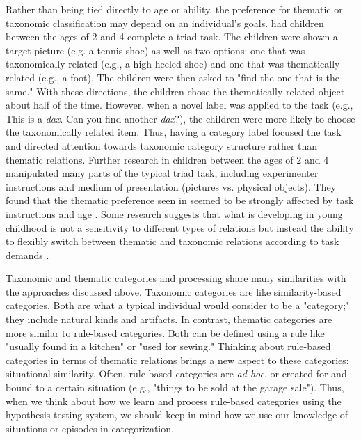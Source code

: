 \documentclass[../dissertation.tex]{subfiles}
\begin{document}
	Rather than being tied directly to age or ability, the preference for thematic or taxonomic classification may depend on an individual's goals. \citet{Markman1984} had children between the ages of 2 and 4 complete a triad task. The children were shown a target picture (e.g. a tennis shoe) as well as two options: one that was taxonomically related (e.g., a high-heeled shoe) and one that was thematically related (e.g., a foot). The children were then asked to "find the one that is the same." With these directions, the children chose the thematically-related object about half of the time. However, when a novel label was applied to the task (e.g., This is a \textit{dax}. Can you find another \textit{dax}?), the children were more likely to choose the taxonomically related item. Thus, having a category label focused the task and directed attention towards taxonomic category structure rather than thematic relations. Further research in children between the ages of 2 and 4 manipulated many parts of the typical triad task, including experimenter instructions and medium of presentation (pictures vs. physical objects). They found that the thematic preference seen in \citet{Smiley1979} seemed to be strongly affected by task instructions and age \citep{Waxman1997}. Some research suggests that what is developing in young childhood is not a sensitivity to different types of relations but instead the ability to flexibly switch between thematic and taxonomic relations according to task demands \citep{Blaye2001}. \par
	Taxonomic and thematic categories and processing share many similarities with the approaches discussed above. Taxonomic categories are like similarity-based categories. Both are what a typical individual would consider to be a "category;" they include natural kinds and artifacts. In contrast, thematic categories are more similar to rule-based categories. Both can be defined using a rule like "usually found in a kitchen" or "used for sewing." Thinking about rule-based categories in terms of thematic relations brings a new aspect to these categories: situational similarity. Often, rule-based categories are \textit{ad hoc}, or created for and bound to a certain situation (e.g., "things to be sold at the garage sale"). Thus, when we think about how we learn and process rule-based categories using the hypothesis-testing system, we should keep in mind how we use our knowledge of situations or episodes in categorization. \par

			
\end{document}
